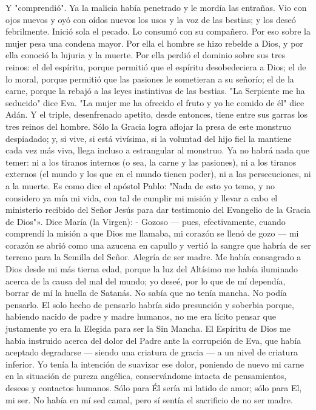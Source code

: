 \documentclass[12pt]{book} %
\begin{document}
Y "comprendió". Ya la malicia había penetrado y le mordía las entrañas. Vio con ojos nuevos y oyó con oídos nuevos los 
usos y la voz de las bestias; y los deseó febrilmente. 
Inició sola el pecado. Lo consumó con su compañero. Por eso sobre la mujer pesa una condena mayor. Por ella el 
hombre se hizo rebelde a Dios, y por ella conoció la lujuria y la muerte. Por ella perdió el dominio sobre sus tres reinos: el del espíritu, porque permitió que el espíritu desobedeciera a Dios; el de lo moral, porque permitió que las pasiones le sometieran a su señorío; el de la carne, porque la rebajó a las leyes instintivas de las bestias. "La Serpiente me ha seducido" dice Eva. "La mujer me ha ofrecido el fruto y yo he comido de él" dice Adán. Y el triple, desenfrenado apetito, desde entonces, tiene entre sus garras los tres reinos del hombre. 
Sólo la Gracia logra aflojar la presa de este monstruo despiadado; y, si vive, si está vivísima, si la voluntad del hijo fiel la 
mantiene cada vez más viva, llega incluso a estrangular al monstruo. Ya no habrá nada que temer: ni a los tiranos internos (o sea, la carne y las pasiones), ni a los tiranos externos (el mundo y los que en el mundo tienen poder), ni a las persecuciones, ni a la muerte. Es como dice el apóstol Pablo: "Nada de esto yo temo, y no considero ya mía mi vida, con tal de cumplir mi misión y llevar a cabo el ministerio recibido del Señor Jesús para dar testimonio del Evangelio de la Gracia de Dios"». 
Dice María (la Virgen): 
- Gozoso — pues, efectivamente, cuando comprendí la misión a que Dios me llamaba, mi corazón se llenó de gozo — mi 
corazón se abrió como una azucena en capullo y vertió la sangre que habría de ser terreno para la Semilla del Señor. 
Alegría de ser madre. 
Me había consagrado a Dios desde mi más tierna edad, porque la luz del Altísimo me había iluminado acerca de la causa 
del mal del mundo; yo deseé, por lo que de mí dependía, borrar de mí la huella de Satanás. 
No sabía que no tenía mancha. No podía pensarlo. El solo hecho de pensarlo habría sido presunción y soberbia porque, 
habiendo nacido de padre y madre humanos, no me era lícito pensar que justamente yo era la Elegida para ser la Sin Mancha. 
El Espíritu de Dios me había instruido acerca del dolor del Padre ante la corrupción de Eva, que había aceptado degradarse — siendo una criatura de gracia — a un nivel de criatura inferior. Yo tenía la intención de suavizar ese dolor, poniendo de nuevo mi carne en la situación de pureza angélica, conservándome intacta de pensamientos, deseos y contactos humanos. Sólo para Él sería mi latido de amor; sólo para El, mi ser. No había en mí sed camal, pero sí sentía el sacrificio de no ser madre. 
\end{document}
